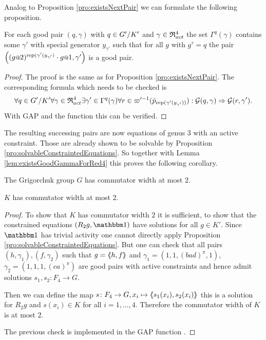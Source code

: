 \documentclass[a4paper,11pt]{amsart}
\begin{document}
Analog to Proposition \ref{pro:existsNextPair} we can formulate the following proposition.
\begin{pro}\label{pro:existsNextPair4}
 For each good pair $(q,\gamma)$ with $q\in{G'/K'}$ and $\gamma\in\mathfrak{R}^4_{act}$ the set $\Gamma^q(\gamma)$ 
 contains some $\gamma'$ with special generator $y_{\gamma'}$ such that for all $g$ with $g^\tau=q$ the
 pair $\left((g\at{2})^{\textup{rep}(\gamma'(y_{\gamma'})}\cdot g\at{1},\gamma'\right)$ is a good pair.
\end{pro}
\begin{proof}
The proof is the same as for Proposition \ref{pro:existsNextPair}. The corresponding formula which needs to be checked is 
\[\forall q\in{G'/K'}
      \forall \gamma\in\mathfrak{R}^4_{act} 
	 \exists \gamma'\in \Gamma^q(\gamma)
	    \forall r\in \varpi'^{-1}(\bar p_{\textup{rep}(\gamma'(y_{\gamma'}))}):
	      \mathcal{G}(q,\gamma) \Rightarrow \mathcal{G}(r,\gamma').\]
 With GAP and the function  this can be verified. 
\end{proof}
The resulting successing pairs are now equations of genus $3$ with an active constraint. Those are already shown to be solvable 
by Proposition \ref{pro:solvableConstraintedEquations}. So together with Lemma \ref{lem:existsGoodGammaForRed4} this proves the following corollary.
\begin{cor}\label{cor:GhasCW2}
 The Grigorchuk group $G$ has commutator width at most $2$.
\end{cor}
\begin{cor}\label{cor:KhasCW2}
 $K$ has commutator width at most $2$. 
\end{cor}
\begin{proof}
 To show that $K$ has commutator width $2$ it is sufficient, to show that the constrained equations $(R_2g,\id)$ have solutions for all $g\in K'$. 
 Since $\id$ has trivial activity one cannot directly apply Proposition \ref{pro:solvableConstraintedEquations}.
 But one can check that all pairs $(h,\gamma_1),(f,\gamma_2)$
 such that $g=\langle\negthickspace\langle h,f\rangle\negthickspace\rangle$ and $\gamma_1=(1,1,(bad)^\pi,1)$, $\gamma_2=(1,1,1,(ca)^\pi)$
 are good pairs with active constraints and hence admit solutions $s_1,s_2\colon F_4\to G$.
 
 Then we can define the map $s\colon F_4\to G, x_i\mapsto \langle\negthickspace\langle s_1(x_i),s_2(x_i)\rangle\negthickspace\rangle$ this is a solution
 for $R_2g$ and $s(x_i)\in K$ for all $i=1,\ldots,4$. Therefore the commutator width of $K$ is at most $2$.
 
 The previous check is implemented in the GAP function . 
\end{proof}
\end{document}
